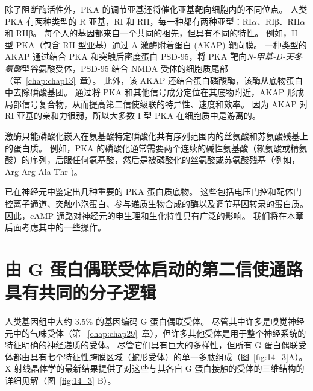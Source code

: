 除了阻断酶活性外，PKA 的调节亚基还将催化亚基靶向细胞内的不同位点。
人类 PKA 有两种类型的 R 亚基，RI 和 RII，每一种都有两种亚型：RI$\alpha$、RIβ、RII$\alpha$ 和 RIIβ。
每个人的基因都来自一个共同的祖先，但具有不同的特性。
例如，II 型 PKA（包含 RII 型亚基）通过 A 激酶附着蛋白 (AKAP) 靶向膜。
一种类型的 AKAP 通过结合 PKA 和突触后密度蛋白 PSD-95，将 PKA 靶向\textit{N-甲基-D-天冬氨酸}型谷氨酸受体，PSD-95 结合 NMDA 受体的细胞质尾部（第~\ref{chap:chap13}~章）。
此外，该 AKAP 还结合蛋白磷酸酶，该酶从底物蛋白中去除磷酸基团。
通过将 PKA 和其他信号成分定位在其底物附近，AKAP 形成局部信号复合物，从而提高第二信使级联的特异性、速度和效率。
因为 AKAP 对 RI 亚基的亲和力很弱，所以大多数 I 型 PKA 在细胞质中是游离的。


激酶只能磷酸化嵌入在氨基酸特定磷酸化共有序列范围内的丝氨酸和苏氨酸残基上的蛋白质。
例如，PKA 的磷酸化通常需要两个连续的碱性氨基酸（赖氨酸或精氨酸）的序列，后跟任何氨基酸，然后是被磷酸化的丝氨酸或苏氨酸残基（例如，Arg-Arg-Ala-Thr )。


已在神经元中鉴定出几种重要的 PKA 蛋白质底物。
这些包括电压门控和配体门控离子通道、突触小泡蛋白、参与递质生物合成的酶以及调节基因转录的蛋白质。
因此，cAMP 通路对神经元的电生理和生化特性具有广泛的影响。
我们将在本章后面考虑其中的一些操作。



\section{由 G 蛋白偶联受体启动的第二信使通路具有共同的分子逻辑}

人类基因组中大约 3.5\% 的基因编码 G 蛋白偶联受体。
尽管其中许多是嗅觉神经元中的气味受体（第 ~\ref{chap:chap29}~章），但许多其他受体是用于整个神经系统的特征明确的神经递质的受体。
尽管它们具有巨大的多样性，但所有 G 蛋白偶联受体都由具有七个特征性跨膜区域（蛇形受体）的单一多肽组成（图~\ref{fig:14_3}A）。
X 射线晶体学的最新结果提供了对这些与其各自 G 蛋白接触的受体的三维结构的详细见解（图~\ref{fig:14_3} B）。


